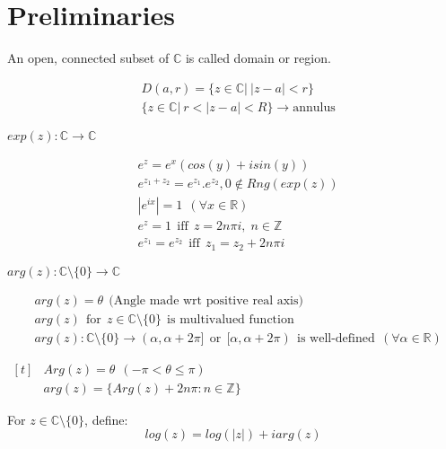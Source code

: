 \chapter{Preliminaries}
\begin{defn}
An open, connected subset of $\mathds{C}$ is called domain or region.
\end{defn}
\begin{align}
&D(a,r)=\{z\in \mathds{C}|\: |z-a|<r\} \nonumber\\
&\{z\in \mathds{C}|\:r<|z-a|<R\}  \rightarrow \text{annulus} \nonumber
\end{align}
\begin{defn}
$exp(z):\mathds{C}\rightarrow\mathds{C}$
\end{defn} 
\vspace{-2mm}
\begin{align}
&e^z=e^x(cos(y)+isin(y))\nonumber\\
&e^{z_1+z_2}=e^{z_1}.e^{z_2},  0\notin Rng(exp(z))\nonumber\\
&|e^{ix}|=1  \:\: (\forall x\in \mathds{R})\nonumber\\
&e^{z}=1 \:\:\text{iff} \:\: z=2n\pi i\text{,} \:\: n\in \mathds{Z}\nonumber\\
&e^{z_1}=e^{z_2} \:\:\text{iff}\:\: z_1=z_2+2n\pi i\nonumber
\end{align}
\begin{defn}
$arg(z):\mathds{C}\setminus \{0\}\rightarrow\mathds{C}$
\end{defn}
\vspace{-2mm}
\begin{align}
&arg(z)=\theta \:\:\text{(Angle made wrt positive real axis)} \nonumber\\
&arg(z) \:\:\text{for} \:\: z\in \mathds{C}\setminus \{0\} \:\:\text{is multivalued function} \nonumber\\
&arg(z): \mathds{C}\setminus \{0\}\rightarrow (\alpha,\alpha+2\pi] \:\:\text{or}\:\: [\alpha,\alpha+2\pi) \:\:\text{is well-defined}\:\: (\forall \alpha \in \mathds{R})\nonumber
\end{align} 
\begin{defn}
$\begin{aligned}[t] 
&Arg(z)=\theta  \:\: (-\pi<\theta\leq \pi)\\ &arg(z)=\{Arg(z)+2n\pi:n\in \mathds{Z}\}
\end{aligned}$ \:\:
\end{defn}
\begin{defn}
For $z\in \mathds{C}\setminus \{0\}$, define: \begin{equation} log(z)=log(|z|)+ iarg(z) \nonumber \end{equation} 
\end{defn}
